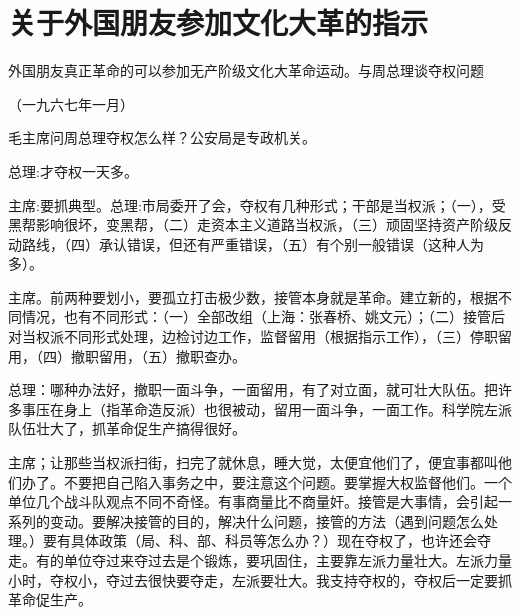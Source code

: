 \section[关于外国朋友参加文化大革的指示（一九六七年一月二十八日）]{关于外国朋友参加文化大革的指示}


外国朋友真正革命的可以参加无产阶级文化大革命运动。与周总理谈夺权问题

{\raggedleft （一九六七年一月）\par}

毛主席问周总理夺权怎么样？公安局是专政机关。

总理:才夺权一天多。

主席:要抓典型。总理:市局委开了会，夺权有几种形式；干部是当权派；（一），受黑帮影响很坏，变黑帮，（二）走资本主义道路当权派，（三）顽固坚持资产阶级反动路线，（四）承认错误，但还有严重错误，（五）有个别一般错误（这种人为多）。

主席。前两种要划小，要孤立打击极少数，接管本身就是革命。建立新的，根据不同情况，也有不同形式：（一）全部改组（上海：张春桥、姚文元）；（二）接管后对当权派不同形式处理，边检讨边工作，监督留用（根据指示工作），（三）停职留用，（四）撤职留用，（五）撤职查办。

总理：哪种办法好，撤职一面斗争，一面留用，有了对立面，就可壮大队伍。把许多事压在身上（指革命造反派）也很被动，留用一面斗争，一面工作。科学院左派队伍壮大了，抓革命促生产搞得很好。

主席；让那些当权派扫街，扫完了就休息，睡大觉，太便宜他们了，便宜事都叫他们办了。不要把自己陷入事务之中，要注意这个问题。要掌握大权监督他们。一个单位几个战斗队观点不同不奇怪。有事商量比不商量奸。接管是大事情，会引起一系列的变动。要解决接管的目的，解决什么问题，接管的方法（遇到问题怎么处理。）要有具体政策（局、科、部、科员等怎么办？）现在夺权了，也许还会夺走。有的单位夺过来夺过去是个锻炼，要巩固住，主要靠左派力量壮大。左派力量小时，夺权小，夺过去很快要夺走，左派要壮大。我支持夺权的，夺权后一定要抓革命促生产。


